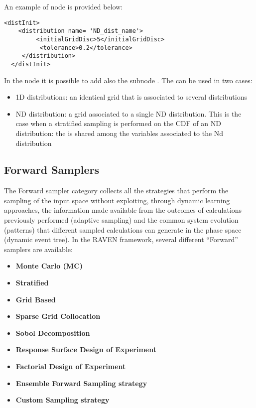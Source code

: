 An example of  node is provided below:

\begin{lstlisting}[style=XML]
<distInit>
    <distribution name= 'ND_dist_name'>
         <initialGridDisc>5</initialGridDisc>
          <tolerance>0.2</tolerance>
     </distribution>
  </distInit>
\end{lstlisting}

In the   node it is possible to add also the subnode .
The  can be used in two cases:
\begin{itemize}
\item 1D distributions: an identical grid that is associated to several distributions
\item ND distribution: a grid associated to a single ND distribution. This is the case when a stratified sampling is performed on the CDF of an ND distribution: the   is  shared among the variables associated to the Nd distribution
\end{itemize}

\subsection{Forward Samplers}
\label{subsec:onceThroughSamplers}
The Forward sampler category collects all the strategies that perform the
sampling of the input space without exploiting, through dynamic learning
approaches, the information made available from the outcomes of calculations
previously performed (adaptive sampling) and the common system evolution
(patterns) that different sampled calculations can generate in the phase space
(dynamic event tree).
%
In the RAVEN framework, several different ``Forward'' samplers
are available:
\begin{itemize}
\item \textbf{Monte Carlo (MC)}
\item \textbf{Stratified}
\item \textbf{Grid Based}
\item \textbf{Sparse Grid Collocation}
\item \textbf{Sobol Decomposition}
\item \textbf{Response Surface Design of Experiment}
\item \textbf{Factorial Design of Experiment}
\item \textbf{Ensemble Forward Sampling strategy}
\item \textbf{Custom Sampling strategy}
\end{itemize}

